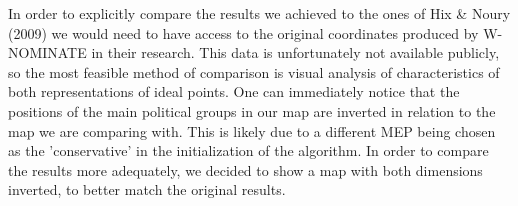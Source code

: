 \documentclass{report}
\begin{document}
                In order to explicitly compare the results we achieved to the ones of Hix & Noury (2009) we would need
                to have
                access to the original coordinates produced by W-NOMINATE in their research. This data is
                unfortunately not available publicly, so the most feasible method of comparison is visual analysis
                of characteristics of both representations of ideal points. One can immediately notice that the
                positions of the main political groups in our map are inverted in relation to the map we are
                comparing with. This is likely due to a different MEP being chosen as the 'conservative' in the
                initialization of the algorithm. In order to compare the results more adequately, we decided to show
                a map with both dimensions inverted, to better match the original results.
\end{document}
